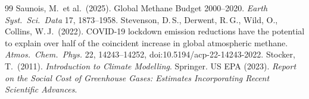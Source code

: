 \documentclass[11pt,a4paper]{article}
\begin{document}
\begin{thebibliography}{99}
 Saunois, M.\ et al.\ (2025). Global Methane Budget 2000--2020. \emph{Earth Syst.\ Sci.\ Data} 17, 1873--1958.
 Stevenson, D.\,S., Derwent, R.\,G., Wild, O., Collins, W.\,J.\ (2022). COVID-19 lockdown emission reductions have the potential to explain over half of the coincident increase in global atmospheric methane. \emph{Atmos.\ Chem.\ Phys.} 22, 14243--14252, doi:10.5194/acp-22-14243-2022.
 Stocker, T.\ (2011). \emph{Introduction to Climate Modelling}. Springer.
 US EPA (2023). \emph{Report on the Social Cost of Greenhouse Gases: Estimates Incorporating Recent Scientific Advances}.
\end{thebibliography}
\end{document}

